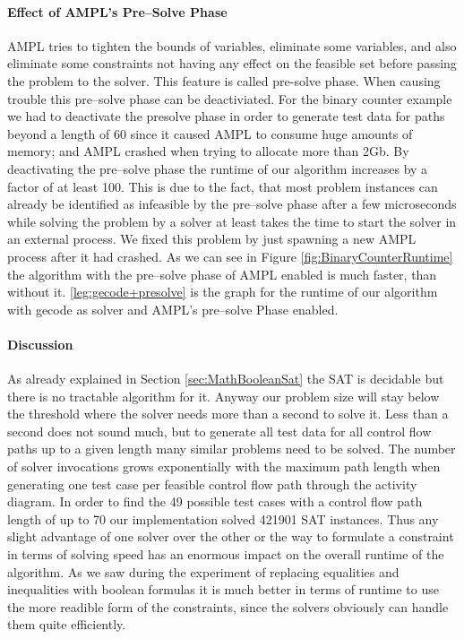 \paragraph{Effect of AMPL's Pre--Solve Phase}
AMPL tries to tighten the bounds of variables, eliminate some variables, and also eliminate some constraints not having any effect on the feasible set before passing the problem to the solver. This feature is called pre-solve phase. When causing trouble this pre--solve phase can be deactiviated. For the binary counter example we had to deactivate the presolve phase in order to generate test data for paths beyond a length of 60 since it caused AMPL to consume huge amounts of memory; and AMPL crashed when trying to allocate more than 2Gb. By deactivating the pre--solve phase the runtime of our algorithm increases by a factor of at least 100. This is due to the fact, that most problem instances can already be identified as infeasible by the pre--solve phase after a few microseconds while solving the problem by a solver at least takes the time to start the solver in an external process. We fixed this problem by just spawning a new AMPL process after it had crashed. As we can see in Figure \ref{fig:BinaryCounterRuntime} the algorithm with the pre--solve phase of AMPL enabled is much faster, than without it. \ref{leg:gecode+presolve} is the graph for the runtime of our algorithm with gecode as solver and AMPL's pre--solve Phase enabled.
\paragraph{Discussion}
As already explained in Section \ref{sec:MathBooleanSat} the SAT is decidable but there is no tractable algorithm for it. Anyway our problem size will stay below the threshold where the solver needs more than a second to solve it. Less than a second does not sound much, but to generate all test data for all control flow paths up to a given length many similar problems need to be solved. The number of solver invocations grows exponentially with the maximum path length when generating one test case per feasible control flow path through the activity diagram. In order to find the 49 possible test cases with a control flow path length of up to 70 our implementation solved 421901 SAT instances. Thus any slight advantage of one solver over the other or the way to formulate a constraint in terms of solving speed has an enormous impact on the overall runtime of the algorithm. As we saw during the experiment of replacing equalities and inequalities with boolean formulas it is much better in terms of runtime to use the more readible form of the constraints, since the solvers obviously can handle them quite efficiently.

